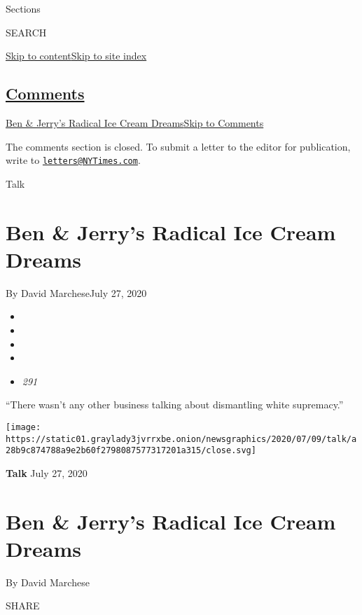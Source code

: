 Sections

SEARCH

\protect\hyperlink{site-content}{Skip to
content}\protect\hyperlink{site-index}{Skip to site index}

\hypertarget{comments}{%
\subsection{\texorpdfstring{\protect\hyperlink{commentsContainer}{Comments}}{Comments}}\label{comments}}

\href{}{Ben \& Jerry's Radical Ice Cream Dreams}\href{}{Skip to
Comments}

The comments section is closed. To submit a letter to the editor for
publication, write to
\href{mailto:letters@NYTimes.com}{\nolinkurl{letters@NYTimes.com}}.

Talk

\hypertarget{ben--jerrys-radical-ice-cream-dreams}{%
\section{Ben \& Jerry's Radical Ice Cream
Dreams}\label{ben--jerrys-radical-ice-cream-dreams}}

By David MarcheseJuly 27, 2020

\begin{itemize}
\item
\item
\item
\item
\item
  \emph{291}
\end{itemize}

``There wasn't any other business talking about dismantling white
supremacy.''

\texttt{[image: https://static01.graylady3jvrrxbe.onion/newsgraphics/2020/07/09/talk/a28b9c874788a9e2b60f2798087577317201a315/close.svg]}

\textbf{Talk} July 27, 2020

\hypertarget{ben--jerrys-radical-ice-cream-dreams-1}{%
\section{Ben \& Jerry's Radical Ice Cream
Dreams}\label{ben--jerrys-radical-ice-cream-dreams-1}}

By David Marchese

SHARE

